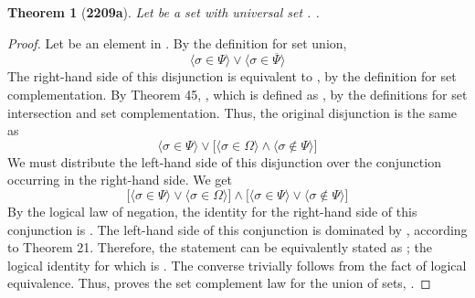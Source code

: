 \documentclass[preview]{standalone}
\newtheorem{theorem}{Theorem}
\begin{document}
\begin{theorem}[\textbf{2209a}]
    Let \bm{$\Psi$} be a set with universal set \bm{$\Omega$}.
    \bm{$\Psi \cup \overline{\Psi} = \Omega$}.
\end{theorem}
\begin{proof}
    Let \bm{$\sigma$} be an element in \bm{$\Psi \cup \overline{\Psi}$}. 
    By the definition for set union,  
    \begin{equation*}
        \Big \langle \sigma \in \Psi \Big \rangle 
            \lor 
        \Big \langle \sigma \in \overline{\Psi} \Big \rangle
    \end{equation*}
    The right-hand side of this disjunction is equivalent to \bm{$\sigma \in \Omega - \Psi$}, 
    by the definition for set complementation. 
    By Theorem 45, \bm{$\sigma \in \Omega \cap \overline{\Psi}$}, 
    which is defined as 
    \bm{$\big \langle \sigma \in \Omega \big \rangle 
        \land 
    \big \langle \sigma \notin \Psi \big \rangle$},
    by the definitions for set intersection and set complementation. 
    Thus, the original disjunction is the same as 
    \begin{equation*}
        \Big \langle \sigma \in \Psi \Big \rangle 
            \lor 
        \Bigg[
            \Big \langle \sigma \in \Omega \Big \rangle 
                \land 
            \Big \langle \sigma \notin \Psi \Big \rangle
        \Bigg]
    \end{equation*}
    We must distribute the left-hand side of this disjunction over the conjunction occurring in the right-hand side. 
    We get 
    \begin{equation*}
        \Bigg[
            \Big \langle \sigma \in \Psi \Big \rangle 
                \lor 
            \Big \langle \sigma \in \Omega \Big \rangle
        \Bigg] 
            \land 
        \Bigg[
            \Big \langle \sigma \in \Psi \Big \rangle 
                \lor 
            \Big \langle \sigma \notin \Psi \Big \rangle
        \Bigg]
    \end{equation*}
    By the logical law of negation, 
    the identity for the right-hand side of this conjunction is \bm{$\top$}. 
    The left-hand side of this conjunction is dominated by \bm{$\Omega$}, 
    according to Theorem 21. 
    Therefore, 
    the statement \bm{$\sigma \in \Psi \cup \overline{\Psi}$} can be equivalently stated as 
    \bm{$\big \langle \sigma \in \Omega \big \rangle \land \top$}; 
    the logical identity for which is \bm{$\sigma \in \Omega$}. 
    The converse trivially follows from the fact of logical equivalence. 
    Thus, 
    proves the set complement law for the union of sets, 
    \bm{$\Psi \cup \overline{\Psi} = \Omega$}.
\end{proof}
\end{document}
